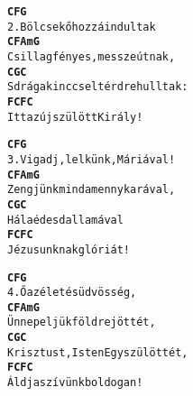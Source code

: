 \begin{minipage}{\textwidth}
\kottastart
{}
\kottaend
\begin{minipage}{\textwidth}
\begin{multicols}{2}
\begin{minipage}{\textwidth}
\begin{alltt}
\textbf{    C           F    G}
2. Bölcsek őhozzá indultak
\textbf{     C     F      Am     G}
   Csillagfényes, messze útnak,
\textbf{       C             G      C}
   S drága kinccsel térdre hulltak:
\textbf{   F      C     F      C}
   Itt az újszülött Király!
\end{alltt}
\vspace{0.0cm}
\versszakspacing
\end{minipage}
\begin{minipage}{\textwidth}
\begin{alltt}
\textbf{   C                 F G}
3. Vigadj, lelkünk, Máriával!
\textbf{   C         F      Am      G}
   Zengjünk mind a menny karával,
\textbf{   C          G    C}
   Hála édes dallamával
\textbf{    F   C        F  C}
   Jézusunknak glóriát!
\end{alltt}
\vspace{0.0cm}
\versszakspacing
\end{minipage}
\begin{minipage}{\textwidth}
\begin{alltt}
\textbf{   C         F     G}
4. Ő az élet és üdvösség,
\textbf{   C    F      Am     G}
   Ünnepeljük földre jöttét,
\textbf{     C              G      C}
   Krisztust, Isten Egyszülöttét,
\textbf{   F       C      F    C}
   Áldja szívünk boldogan!
\end{alltt}
\vspace{0.0cm}
\versszakspacing
\end{minipage}
\vspace{0.2cm}
\end{multicols}
\end{minipage}

\end{minipage}
~\vspace{1.0cm}
\newline
